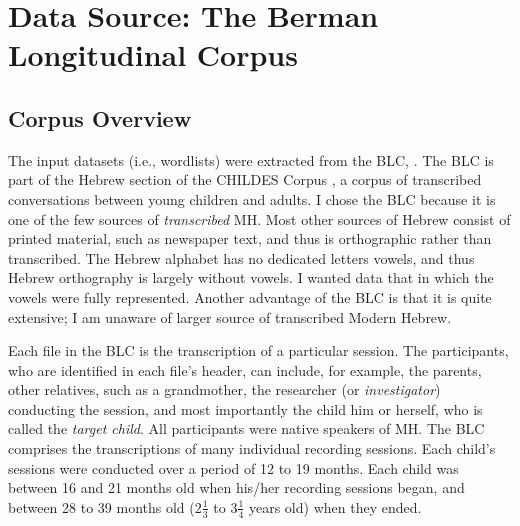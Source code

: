 \section{Data Source: The Berman Longitudinal Corpus}

\subsection{Corpus Overview}
The input datasets (i.e., wordlists) were extracted from the \ac{BLC},   %
\citep{berman-weissenborn:1991}.
The \ac{BLC} is part of the Hebrew section of the CHILDES Corpus \citep{macwhinney:2000a}, a
corpus of transcribed 
conversations between young children and adults. %
I chose the \ac{BLC} because it is one of the few sources of \emph{transcribed} \ac{MH}. Most other sources of Hebrew consist of printed material, such as newspaper text, and thus is orthographic rather than
transcribed. The Hebrew alphabet has no dedicated letters vowels, and thus Hebrew orthography is largely without vowels. I wanted data that in which the vowels were fully represented. Another advantage of the \ac{BLC} is that it is quite extensive; I am unaware of larger source of transcribed Modern Hebrew. 

Each file in the BLC is the transcription of a particular session. 
The participants, who are identified in each file's
header, can include, for example, the parents,
 other relatives, such as a grandmother, 
the researcher (or \emph{investigator}) conducting the session, and most importantly the child him or herself, who is called
the \emph{target child}. All participants were native speakers of \ac{MH}. %
The \ac{BLC} comprises the transcriptions of many individual recording sessions. Each child's sessions 
were conducted over a period of 12 to 19 months.
Each child was between 16 and 21 months old when his/her 
recording sessions began, and between 28 to 39 months old ($2\frac{1}{3}$ to $3\frac{1}{4}$ years old) when they ended.

